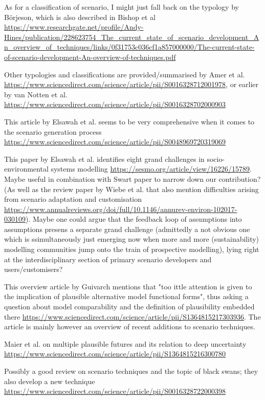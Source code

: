 \documentclass{article}
\begin{document}
As for a classification of scenario, I might just fall back on the typology by Börjeson, which is also described in Bishop et al \url{https://www.researchgate.net/profile/Andy-Hines/publication/228623754_The_current_state_of_scenario_development_An_overview_of_techniques/links/0f31753c036cf1a857000000/The-current-state-of-scenario-development-An-overview-of-techniques.pdf}

Other typologies and classifications are provided/summarised by Amer et al. \url{https://www.sciencedirect.com/science/article/pii/S0016328712001978}, or earlier by van Notten et al. \url{https://www.sciencedirect.com/science/article/pii/S0016328702000903}

This article by Elsawah et al. seems to be very comprehensive when it comes to the scenario generation process \url{https://www.sciencedirect.com/science/article/pii/S0048969720319069}

This paper by Elsawah et al. identifies eight grand challenges in socio-environmental systems modelling \url{https://sesmo.org/article/view/16226/15789}. Maybe useful in combination with Swart paper to narrow down our contribution? (As well as the review paper by Wiebe et al. that also mention difficulties arising from scenario adaptation and customisation \url{https://www.annualreviews.org/doi/full/10.1146/annurev-environ-102017-030109}). Maybe one could argue that the feedback loop of assumptions into assumptions presens a separate grand challenge (admittedly a not obvious one which is ssimultaneously just emerging now when more and more (sustainability) modelling communities jump onto the train of prospective modelling), lying right at the interdisciplinary section of primary scenario developers and users/customisers?

This overview article by Guivarch mentions that "too ittle attention is given to the implication of plausible alternative model functional forms", thus asking a question about model comparability and the definition of plausibility embedded there \url{https://www.sciencedirect.com/science/article/pii/S1364815217303936}. The article is mainly however an overview of recent additions to scenario techniques.

Maier et al. on multiple plausible futures and its relation to deep uncertainty \url{https://www.sciencedirect.com/science/article/pii/S1364815216300780}

Possibly a good review on scenario techniques and the topic of black swans; they also develop a new technique \url{https://www.sciencedirect.com/science/article/pii/S0016328722000398}
\end{document}

